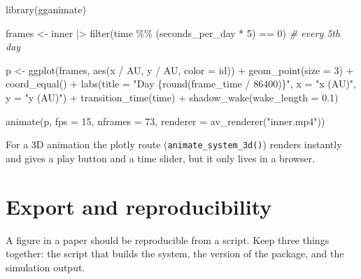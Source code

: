 \documentclass[
  10.5pt,
  letterpaper,
]{scrbook}
\newenvironment{Shaded}{\begin{snugshade}}{\end{snugshade}}
\newcommand{\AttributeTok}[1]{\textcolor[rgb]{0.00,0.00,0.00}{#1}}
\newcommand{\CommentTok}[1]{\textcolor[rgb]{0.00,0.00,0.00}{\textit{#1}}}
\newcommand{\DecValTok}[1]{\textcolor[rgb]{0.00,0.00,0.00}{#1}}
\newcommand{\FloatTok}[1]{\textcolor[rgb]{0.00,0.00,0.00}{#1}}
\newcommand{\FunctionTok}[1]{\textcolor[rgb]{0.00,0.00,0.00}{#1}}
\newcommand{\NormalTok}[1]{\textcolor[rgb]{0.00,0.00,0.00}{#1}}
\newcommand{\OtherTok}[1]{\textcolor[rgb]{0.00,0.00,0.00}{#1}}
\newcommand{\SpecialCharTok}[1]{\textcolor[rgb]{0.00,0.00,0.00}{#1}}
\newcommand{\StringTok}[1]{\textcolor[rgb]{0.00,0.00,0.00}{#1}}
\theoremstyle{definition}
\theoremstyle{plain}
\theoremstyle{remark}
\begin{document}
\begin{Shaded}
\begin{Highlighting}[]
\FunctionTok{library}\NormalTok{(gganimate)}

\NormalTok{frames }\OtherTok{\textless{}{-}}\NormalTok{ inner }\SpecialCharTok{|\textgreater{}} \FunctionTok{filter}\NormalTok{(time }\SpecialCharTok{\%\%}\NormalTok{ (seconds\_per\_day }\SpecialCharTok{*} \DecValTok{5}\NormalTok{) }\SpecialCharTok{==} \DecValTok{0}\NormalTok{)   }\CommentTok{\# every 5th day}

\NormalTok{p }\OtherTok{\textless{}{-}} \FunctionTok{ggplot}\NormalTok{(frames, }\FunctionTok{aes}\NormalTok{(x }\SpecialCharTok{/}\NormalTok{ AU, y }\SpecialCharTok{/}\NormalTok{ AU, }\AttributeTok{color =}\NormalTok{ id)) }\SpecialCharTok{+}
  \FunctionTok{geom\_point}\NormalTok{(}\AttributeTok{size =} \DecValTok{3}\NormalTok{) }\SpecialCharTok{+}
  \FunctionTok{coord\_equal}\NormalTok{() }\SpecialCharTok{+}
  \FunctionTok{labs}\NormalTok{(}\AttributeTok{title =} \StringTok{"Day \{round(frame\_time / 86400)\}"}\NormalTok{, }\AttributeTok{x =} \StringTok{"x (AU)"}\NormalTok{, }\AttributeTok{y =} \StringTok{"y (AU)"}\NormalTok{) }\SpecialCharTok{+}
  \FunctionTok{transition\_time}\NormalTok{(time) }\SpecialCharTok{+}
  \FunctionTok{shadow\_wake}\NormalTok{(}\AttributeTok{wake\_length =} \FloatTok{0.1}\NormalTok{)}

\FunctionTok{animate}\NormalTok{(p, }\AttributeTok{fps =} \DecValTok{15}\NormalTok{, }\AttributeTok{nframes =} \DecValTok{73}\NormalTok{, }\AttributeTok{renderer =} \FunctionTok{av\_renderer}\NormalTok{(}\StringTok{"inner.mp4"}\NormalTok{))}
\end{Highlighting}
\end{Shaded}

For a 3D animation the plotly route (\texttt{animate\_system\_3d()})
renders instantly and gives a play button and a time slider, but it only
lives in a browser.

\section{Export and reproducibility}\label{export-and-reproducibility}

A figure in a paper should be reproducible from a script. Keep three
things together: the script that builds the system, the version of the
package, and the simulation output.
\end{document}
